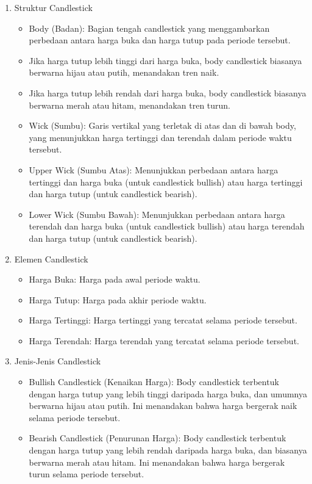 \begin{enumerate}
    \item Struktur Candlestick
    \begin{itemize}
        \item Body (Badan): Bagian tengah candlestick yang menggambarkan perbedaan antara harga buka dan harga tutup pada periode tersebut.
        \item Jika harga tutup lebih tinggi dari harga buka, body candlestick biasanya berwarna hijau atau putih, menandakan tren naik.
        \item Jika harga tutup lebih rendah dari harga buka, body candlestick biasanya berwarna merah atau hitam, menandakan tren turun.
        \item Wick (Sumbu): Garis vertikal yang terletak di atas dan di bawah body, yang menunjukkan harga tertinggi dan terendah dalam periode waktu tersebut.
        \item Upper Wick (Sumbu Atas): Menunjukkan perbedaan antara harga tertinggi dan harga buka (untuk candlestick bullish) atau harga tertinggi dan harga tutup (untuk candlestick bearish).
        \item Lower Wick (Sumbu Bawah): Menunjukkan perbedaan antara harga terendah dan harga buka (untuk candlestick bullish) atau harga terendah dan harga tutup (untuk candlestick bearish).

    \end{itemize}
    \item Elemen Candlestick
    \begin{itemize}
        \item Harga Buka: Harga pada awal periode waktu.
        \item Harga Tutup: Harga pada akhir periode waktu.
        \item Harga Tertinggi: Harga tertinggi yang tercatat selama periode tersebut.
        \item Harga Terendah: Harga terendah yang tercatat selama periode tersebut.
    \end{itemize}
    \item Jenis-Jenis Candlestick
    \begin{itemize}
        \item Bullish Candlestick (Kenaikan Harga): Body candlestick terbentuk dengan harga tutup yang lebih tinggi daripada harga buka, dan umumnya berwarna hijau atau putih. Ini menandakan bahwa harga bergerak naik selama periode tersebut.
        \item Bearish Candlestick (Penurunan Harga): Body candlestick terbentuk dengan harga tutup yang lebih rendah daripada harga buka, dan biasanya berwarna merah atau hitam. Ini menandakan bahwa harga bergerak turun selama periode tersebut.
    \end{itemize}
\end{enumerate}
